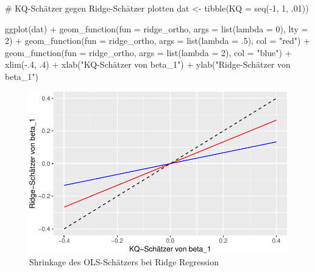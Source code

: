 \documentclass[
  a4paper,
  DIV=11,
  oneside]{scrreprt}
\newenvironment{Shaded}{\begin{snugshade}}{\end{snugshade}}
\newcommand{\AttributeTok}[1]{\textcolor[rgb]{0.40,0.45,0.13}{#1}}
\newcommand{\CommentTok}[1]{\textcolor[rgb]{0.37,0.37,0.37}{#1}}
\newcommand{\DecValTok}[1]{\textcolor[rgb]{0.68,0.00,0.00}{#1}}
\newcommand{\FunctionTok}[1]{\textcolor[rgb]{0.28,0.35,0.67}{#1}}
\newcommand{\NormalTok}[1]{\textcolor[rgb]{0.00,0.23,0.31}{#1}}
\newcommand{\OtherTok}[1]{\textcolor[rgb]{0.00,0.23,0.31}{#1}}
\newcommand{\SpecialCharTok}[1]{\textcolor[rgb]{0.37,0.37,0.37}{#1}}
\newcommand{\StringTok}[1]{\textcolor[rgb]{0.13,0.47,0.30}{#1}}
\begin{document}
\begin{Shaded}
\begin{Highlighting}[]
\CommentTok{\# KQ{-}Schätzer gegen Ridge{-}Schätzer plotten}
\NormalTok{dat }\OtherTok{\textless{}{-}} \FunctionTok{tibble}\NormalTok{(}\AttributeTok{KQ =} \FunctionTok{seq}\NormalTok{(}\SpecialCharTok{{-}}\DecValTok{1}\NormalTok{, }\DecValTok{1}\NormalTok{, .}\DecValTok{01}\NormalTok{))}

\FunctionTok{ggplot}\NormalTok{(dat) }\SpecialCharTok{+}
  \FunctionTok{geom\_function}\NormalTok{(}\AttributeTok{fun =}\NormalTok{ ridge\_ortho, }
                \AttributeTok{args =} \FunctionTok{list}\NormalTok{(}\AttributeTok{lambda =}  \DecValTok{0}\NormalTok{), }
                \AttributeTok{lty =} \DecValTok{2}\NormalTok{) }\SpecialCharTok{+} 
  \FunctionTok{geom\_function}\NormalTok{(}\AttributeTok{fun =}\NormalTok{ ridge\_ortho, }
                \AttributeTok{args =} \FunctionTok{list}\NormalTok{(}\AttributeTok{lambda =}\NormalTok{ .}\DecValTok{5}\NormalTok{), }
                \AttributeTok{col =} \StringTok{"red"}\NormalTok{) }\SpecialCharTok{+} 
  \FunctionTok{geom\_function}\NormalTok{(}\AttributeTok{fun =}\NormalTok{ ridge\_ortho, }
                \AttributeTok{args =} \FunctionTok{list}\NormalTok{(}\AttributeTok{lambda =} \DecValTok{2}\NormalTok{), }
                \AttributeTok{col =} \StringTok{"blue"}\NormalTok{) }\SpecialCharTok{+} 
  \FunctionTok{xlim}\NormalTok{(}\SpecialCharTok{{-}}\NormalTok{.}\DecValTok{4}\NormalTok{, .}\DecValTok{4}\NormalTok{) }\SpecialCharTok{+}
  \FunctionTok{xlab}\NormalTok{(}\StringTok{"KQ{-}Schätzer von beta\_1"}\NormalTok{) }\SpecialCharTok{+}
  \FunctionTok{ylab}\NormalTok{(}\StringTok{"Ridge{-}Schätzer von beta\_1"}\NormalTok{)}
\end{Highlighting}
\end{Shaded}

\begin{figure}[t]

{\centering \includegraphics{RegReg_files/figure-pdf/fig-ridgeortho-1.pdf}

}

\caption{\label{fig-ridgeortho}Shrinkage des OLS-Schätzers bei Ridge
Regression}

\end{figure}
\end{document}
